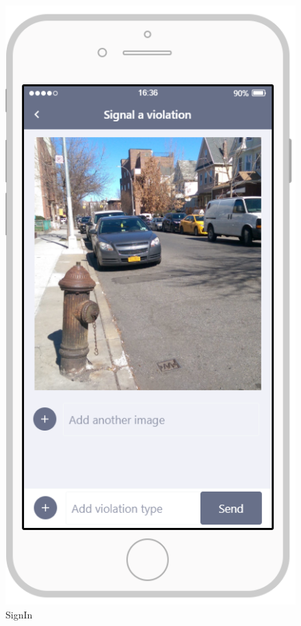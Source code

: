 \documentclass{article}
\begin{document}
\begin{figure}[H]
    \centering
    \includegraphics[scale=0.7]{Images/SignalAViolationAPP}
    \caption{SignIn}
\end{figure}
\end{document}
